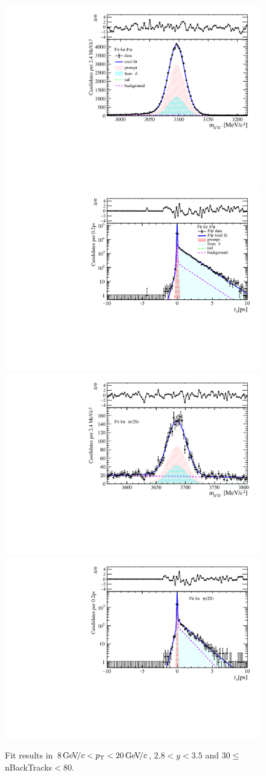\begin{figure}[H]
\begin{center}
\includegraphics[width=0.47\linewidth]{pdf/Jpsi/drawmassB/n5y2pt5.pdf}
\includegraphics[width=0.47\linewidth]{pdf/Jpsi/2DFitB/n5y2pt5.pdf}
\vspace*{-0.5cm}
\includegraphics[width=0.47\linewidth]{pdf/Psi2S/drawmassB/n5y2pt5.pdf}
\includegraphics[width=0.47\linewidth]{pdf/Psi2S/2DFitB/n5y2pt5.pdf}
\vspace*{-0.5cm}
\end{center}
\caption{Fit results in $8\text{\,Ge\kern -0.1em V\!/}c<p_{\mathrm{T}}<20\text{\,Ge\kern -0.1em V\!/}c$, $2.8<y<3.5$ and 30$\leq$nBackTracks$<$80.}
\label{Fitn5y2pt5}
\end{figure}
